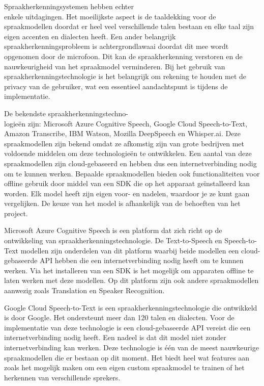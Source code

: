Spraakherkenningsystemen hebben echter \\enkele uitdagingen. Het moeilijkste aspect is de taaldekking voor de spraakmodellen doordat er heel veel verschillende talen bestaan en elke taal zijn eigen accenten en dialecten heeft. Een ander belangrijk spraakherkenningsprobleem is achtergrondlawaai doordat dit mee wordt opgenomen door de microfoon. Dit kan de spraakherkenning verstoren en de nauwkeurigheid van het spraakmodel verminderen. Bij het gebruik van spraakherkenningstechnologie is het belangrijk om rekening te houden met de privacy van de gebruiker, wat een essentieel aandachtspunt is tijdens de implementatie. \autocite{Singh2022}

De bekendste spraakherkenningstechno-\\logieën zijn: Microsoft Azure Cognitive Speech, Google Cloud Speech-to-Text, Amazon Transcribe, IBM Watson, Mozilla DeepSpeech en Whisper.ai. Deze spraakmodellen zijn bekend omdat ze afkomstig zijn van grote bedrijven met voldoende middelen om deze technologieën te ontwikkelen. Een aantal van deze spraakmodellen zijn cloud-gebaseerd en hebben dus een internetverbinding nodig om te kunnen werken. Bepaalde spraakmodellen bieden ook functionaliteiten voor offline gebruik door middel van een SDK die op het apparaat geïnstalleerd kan worden. Elk model heeft zijn eigen voor- en nadelen, waardoor je ze kunt gaan vergelijken. De keuze van het model is afhankelijk van de behoeften van het project. \autocite{Fox2023}

Microsoft Azure Cognitive Speech is een platform dat zich richt op de ontwikkeling van spraakherkenningstechnologie. De Text-to-Speech en Speech-to-Text modellen zijn onderdelen van dit platform waarbij beide modellen een cloud-\\gebaseerde API hebben die een internetverbinding nodig heeft om te kunnen werken. Via het installeren van een SDK is het mogelijk om apparaten offline te laten werken met deze modellen. Op dit platform zijn ook andere spraakmodellen aanwezig zoals Translation en Speaker Recognition. \autocite{Depypere2023}

Google Cloud Speech-to-Text is een spraakherkenningstechnologie die ontwikkeld is door Google. Het ondersteunt meer dan 120 talen en dialecten. Voor de implementatie van deze technologie is een cloud-gebaseerde API vereist die een internetverbinding nodig heeft. Een nadeel is dat dit model niet zonder internetverbinding kan werken. Deze technologie is één van de meest nauwkeurige spraakmodellen die er bestaan op dit moment. Het biedt heel wat features aan zoals het mogelijk maken om een eigen custom spraakmodel te trainen of het herkennen van verschillende sprekers. \autocite{Wang2021}

